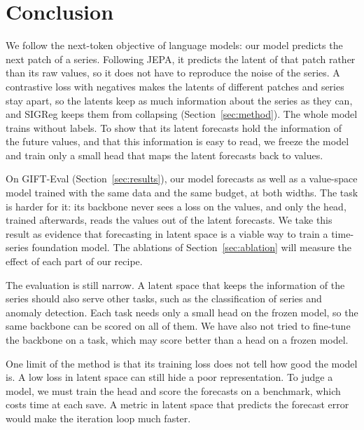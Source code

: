 \section{Conclusion}
\label{sec:conclusion}

We follow the next-token objective of language models: our model
predicts the next patch of a series. Following JEPA, it predicts the
latent of that patch rather than its raw values, so it does not have to
reproduce the noise of the series. A contrastive loss with negatives
makes the latents of different patches and series stay apart, so the
latents keep as much information about the series as they can, and
SIGReg keeps them from collapsing (Section~\ref{sec:method}).
The whole
model trains without labels. To show that its latent forecasts hold the
information of the future values, and that this information is easy to
read, we freeze the model and train only a small head that maps the
latent forecasts back to values.

On GIFT-Eval (Section~\ref{sec:results}), our model forecasts as well
as a value-space model trained with the same data and the same budget,
at both widths. The task is harder for it: its backbone never sees a
loss on the values, and only the head, trained afterwards, reads
the values out of the latent forecasts. We take this result as evidence
that forecasting in latent space is a viable way to train a time-series
foundation model. The ablations of Section~\ref{sec:ablation} will
measure the effect of each part of our recipe.

The evaluation is still narrow. A latent space that keeps the information
of the series should also serve other tasks, such as the
classification of series and anomaly detection. Each task needs only
a small head on the frozen model, so the same backbone can be scored
on all of them. We have also not tried to fine-tune the backbone on a task, which
may score better than a head on a frozen model.

One limit of the method is that its training loss does not tell how
good the model is. A low loss in latent space can still hide a poor
representation. To judge a model, we must train the head and score the
forecasts on a benchmark, which costs time at each save. A metric in
latent space that predicts the forecast error would make the iteration
loop much faster.
